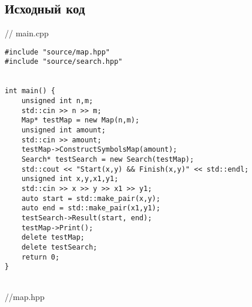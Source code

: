 \documentclass[12pt]{article}
\begin{document}
\subsection*{Исходный код}

// main.cpp
\begin{verbatim}
#include "source/map.hpp"
#include "source/search.hpp"


int main() {
    unsigned int n,m;
    std::cin >> n >> m;
    Map* testMap = new Map(n,m);
    unsigned int amount;
    std::cin >> amount;
    testMap->ConstructSymbolsMap(amount);
    Search* testSearch = new Search(testMap);
    std::cout << "Start(x,y) && Finish(x,y)" << std::endl;
    unsigned int x,y,x1,y1;
    std::cin >> x >> y >> x1 >> y1;
    auto start = std::make_pair(x,y);
    auto end = std::make_pair(x1,y1);
    testSearch->Result(start, end);
    testMap->Print();
    delete testMap;
    delete testSearch;
    return 0;
}
\end{verbatim}
\\
//map.hpp
\end{document}
